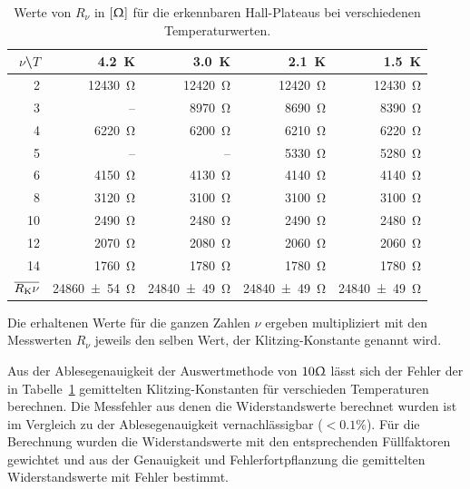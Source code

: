 \documentclass[paper=a4,fontsize=10pt,DIV=18,twocolumn,parskip=half]{scrartcl}
\numberwithin{equation}{section}    %
\begin{document}
\begin{table}[htp]
	\begin{center}
	\begin{tabular}{r|rrrr}
		$\nu$\textbackslash$T$ & \SI{4.2}{\kelvin} & \SI{3.0}{\kelvin} & \SI{2.1}{\kelvin} & \SI{1.5}{\kelvin} \\
		\hline
		2  & \SI{12430}{\ohm} & \SI{12420}{\ohm} & \SI{12420}{\ohm} & \SI{12430}{\ohm}\\
		3  &      \--- &  \SI{8970}{\ohm} &  \SI{8690}{\ohm} &  \SI{8390}{\ohm}\\
		4  &  \SI{6220}{\ohm} &  \SI{6200}{\ohm} &  \SI{6210}{\ohm} &  \SI{6220}{\ohm}\\
		5  &      \--- &      \--- &  \SI{5330}{\ohm} &  \SI{5280}{\ohm}\\
		6  &  \SI{4150}{\ohm} &  \SI{4130}{\ohm} &  \SI{4140}{\ohm} &  \SI{4140}{\ohm}\\
		8  &  \SI{3120}{\ohm} &  \SI{3100}{\ohm} &  \SI{3100}{\ohm} &  \SI{3100}{\ohm}\\
		10 &  \SI{2490}{\ohm} &  \SI{2480}{\ohm} &  \SI{2490}{\ohm} &  \SI{2480}{\ohm}\\
		12 &  \SI{2070}{\ohm} &  \SI{2080}{\ohm} &  \SI{2060}{\ohm} &  \SI{2060}{\ohm}\\
		14 &  \SI{1760}{\ohm} &  \SI{1780}{\ohm} &  \SI{1780}{\ohm} &  \SI{1780}{\ohm}\\
		\hline
		$\overline{R_{\rm K}\nu}$ & \SI[separate-uncertainty=false]{24860(54)}{\ohm} & \SI[separate-uncertainty=false]{24840(49)}{\ohm} & \SI[separate-uncertainty=false]{24840(49)}{\ohm} & \SI[separate-uncertainty=false]{24840(49)}{\ohm}
	\end{tabular}
	\caption{Werte von $R_\nu$ in $\left[\Upomega\right]$ für die erkennbaren Hall-Plateaus bei verschiedenen Temperaturwerten.}
	\label{klitzing}	
	\end{center}
\end{table}

Die erhaltenen Werte für die ganzen Zahlen $\nu$ ergeben multipliziert mit den Messwerten $R_{\nu}$ jeweils den selben Wert, der Klitzing-Konstante genannt wird. 

Aus der Ablesegenauigkeit der Auswertmethode von $10\Upomega$ lässt sich der Fehler der in Tabelle~\ref{klitzing} gemittelten Klitzing-Konstanten für verschieden Temperaturen berechnen. Die Messfehler aus denen die Widerstandswerte berechnet wurden ist im Vergleich zu der Ablesegenauigkeit vernachlässigbar ($<0.1\%$). Für die Berechnung wurden die Widerstandswerte mit den entsprechenden Füllfaktoren gewichtet und aus der Genauigkeit und Fehlerfortpflanzung die gemittelten Widerstandswerte mit Fehler bestimmt. 
\end{document}
